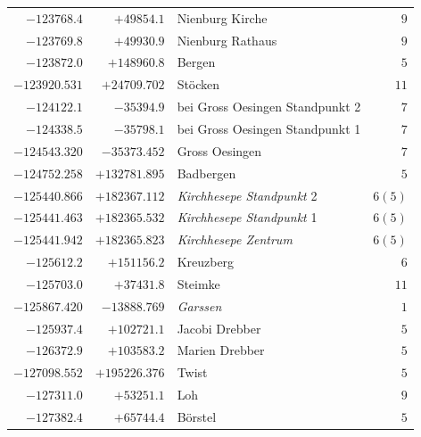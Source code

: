 \begin{center}
\begin{tabular}{r|r|p{170pt}|r}
\(-123768.4\)&\(+49854.1\)&Nienburg Kirche&\(9\)\\
\(-123769.8\)&\(+49930.9\)&Nienburg Rathaus&\(9\)\\
\(-123872.0\)&\(+148960.8\)&Bergen&\(5\)\\
\(-123920.531\)&\(+24709.702\)&Stöcken&\(11\)\\
\(-124122.1\)&\(-35394.9\)&bei Gross Oesingen Standpunkt 2&\(7\)\\
\(-124338.5\)&\(-35798.1\)&bei Gross Oesingen Standpunkt 1&\(7\)\\
\(-124543.320\)&\(-35373.452\)&Gross Oesingen&\(7\)\\
\(-124752.258\)&\(+132781.895\)&Badbergen&\(5\)\\
\(-125440.866\)&\(+182367.112\)&\textit{Kirchhesepe Standpunkt} 2&\(6 (5)\)\\
\(-125441.463\)&\(+182365.532\)&\textit{Kirchhesepe Standpunkt} 1&\(6 (5)\)\\
\(-125441.942\)&\(+182365.823\)&\textit{Kirchhesepe Zentrum}&\(6 (5)\)\\
\(-125612.2\)&\(+151156.2\)&Kreuzberg&\(6\)\\
\(-125703.0\)&\(+37431.8\)&Steimke&\(11\)\\
\(-125867.420\)&\(-13888.769\)&\textit{Garssen}&\(1\)\\
\(-125937.4\)&\(+102721.1\)&Jacobi Drebber&\(5\)\\
\(-126372.9\)&\(+103583.2\)&Marien Drebber&\(5\)\\
\(-127098.552\)&\(+195226.376\)&Twist&\(5\)\\
\(-127311.0\)&\(+53251.1\)&Loh&\(9\)\\
\(-127382.4\)&\(+65744.4\)&Börstel&\(5\)\\
\hline\end{tabular}\endgroup\end{center}
